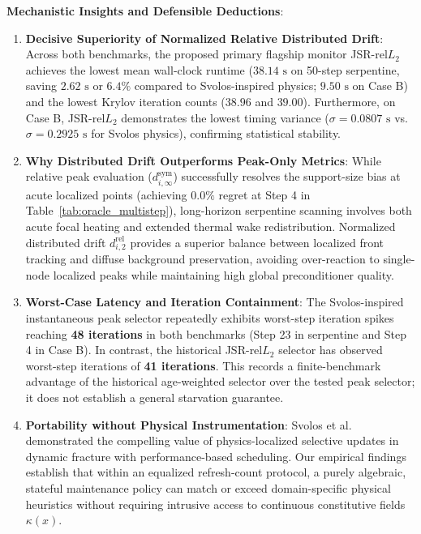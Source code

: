 \documentclass[preprint,12pt,3p]{elsarticle}
\begin{document}
\textbf{Mechanistic Insights and Defensible Deductions}:
\begin{enumerate}
    \item \textbf{Decisive Superiority of Normalized Relative Distributed Drift}: Across both benchmarks, the proposed primary flagship monitor JSR-$\text{rel}L_2$ achieves the lowest mean wall-clock runtime ($38.14\text{ s}$ on 50-step serpentine, saving $2.62\text{ s}$ or $6.4\%$ compared to Svolos-inspired physics; $9.50\text{ s}$ on Case B) and the lowest Krylov iteration counts ($38.96$ and $39.00$). Furthermore, on Case B, JSR-$\text{rel}L_2$ demonstrates the lowest timing variance ($\sigma = 0.0807\text{ s}$ vs.\ $\sigma = 0.2925\text{ s}$ for Svolos physics), confirming statistical stability.
    \item \textbf{Why Distributed Drift Outperforms Peak-Only Metrics}: While relative peak evaluation ($d_{i, \infty}^{\text{sym}}$) successfully resolves the support-size bias at acute localized points (achieving $0.0\%$ regret at Step 4 in Table~\ref{tab:oracle_multistep}), long-horizon serpentine scanning involves both acute focal heating and extended thermal wake redistribution. Normalized distributed drift $d_{i, 2}^{\text{rel}}$ provides a superior balance between localized front tracking and diffuse background preservation, avoiding over-reaction to single-node localized peaks while maintaining high global preconditioner quality.
    \item \textbf{Worst-Case Latency and Iteration Containment}: The Svolos-inspired instantaneous peak selector repeatedly exhibits worst-step iteration spikes reaching \textbf{48 iterations} in both benchmarks (Step 23 in serpentine and Step 4 in Case B). In contrast, the historical JSR-$\text{rel}L_2$ selector has observed worst-step iterations of \textbf{41 iterations}. This records a finite-benchmark advantage of the historical age-weighted selector over the tested peak selector; it does not establish a general starvation guarantee.
    \item \textbf{Portability without Physical Instrumentation}: Svolos et al.~\cite{svolos2020updating} demonstrated the compelling value of physics-localized selective updates in dynamic fracture with performance-based scheduling. Our empirical findings establish that within an equalized refresh-count protocol, a purely algebraic, stateful maintenance policy can match or exceed domain-specific physical heuristics without requiring intrusive access to continuous constitutive fields $\kappa(x)$.
\end{enumerate}
\end{document}
